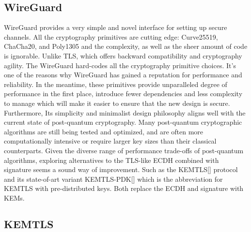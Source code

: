 \subsection{WireGuard}
WireGuard provides a very simple and novel interface for setting up secure channels. All the cryptography primitives are cutting edge: Curve25519, ChaCha20, and Poly1305 and the complexity, as well as the sheer amount of code is ignorable. Unlike TLS, which offers backward compatibility and cryptography agility. The WireGuard hard-codes all the cryptography primitive choices. It's one of the reasons why WireGuard has gained a reputation for performance and reliability. In the meantime, these primitives provide unparalleled degree of performance in the first place, introduce fewer dependencies and less complexity to manage which will make it easier to ensure that the new design is secure. Furthermore, Its simplicity and minimalist design philosophy aligns well with the current state of post-quantum cryptography. Many post-quantum cryptographic algorithms are still being tested and optimized, and are often more computationally intensive or require larger key sizes than their classical counterparts. Given the diverse range of performance trade-offs of post-quantum algorithms, exploring alternatives to the TLS-like ECDH combined with signature seems a sound way of improvement. Such as the KEMTLS[] protocol and its state-of-art variant KEMTLS-PDK[] which is the abbreviation for KEMTLS with pre-distributed keys. Both replace the ECDH and signature with KEMs. 
\subsection{KEMTLS}
